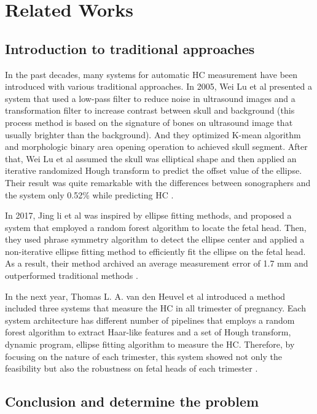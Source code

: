 \chapter{Related Works}
\section{Introduction to traditional approaches}
\label{section:traditional_approaches}
\noindent

	In the past decades, many systems for automatic HC measurement have been introduced with various traditional approaches. In 2005, Wei Lu et al presented a system that used a low-pass filter to reduce noise in ultrasound images and a transformation filter to increase contrast between skull and background (this process method is based on the signature of bones on ultrasound image that usually brighter than the background). And they optimized K-mean algorithm and morphologic binary area opening operation to achieved skull segment. After that, Wei Lu et al assumed the skull was elliptical shape and then applied an iterative randomized Hough transform to predict the offset value of the ellipse. Their result was quite remarkable with the differences between sonographers and the system only 0.52\% while predicting HC \cite{lu}.
	
	In 2017, Jing li et al was inspired by ellipse fitting methods, and proposed a system that employed a random forest algorithm to locate the fetal head. Then, they used phrase symmetry algorithm to detect the ellipse center and applied a non-iterative ellipse fitting method to efficiently fit the ellipse on the fetal head. As a result, their method archived an average measurement error of 1.7 mm and outperformed traditional methods \cite{li}.
	
	In the next year, Thomas L. A. van den Heuvel et al introduced a method included three systems that measure the HC in all trimester of pregnancy. Each system architecture has different number of pipelines that employs a random forest algorithm to extract Haar-like features and a set of Hough transform, dynamic program, ellipse fitting algorithm to measure the HC. Therefore, by focusing on the nature of each trimester, this system showed not only the feasibility but also the robustness on fetal heads of each trimester \cite{thomas}.
	

\section{Conclusion and determine the problem}
\label{section:determine_problem}
\noindent
	
